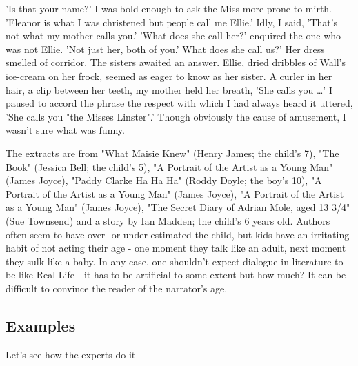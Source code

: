 \documentclass[11pt]{article}
\newenvironment{narrow}[2]{%
 \begin{list}{}{%
  \setlength{\topsep}{0pt}%
  \setlength{\leftmargin}{#1}%
  \setlength{\rightmargin}{#2}%
  \setlength{\listparindent}{\parindent}%
  \setlength{\itemindent}{\parindent}%
  \setlength{\parsep}{\parskip}%
 }%
\item[]}{\end{list}}
\begin{document}
\begin{itemize}
\item
\begin{narrow}{1.0cm}{1.0cm}
'Is that your name?' I was bold enough to ask the Miss more prone to mirth.
'Eleanor is what I was christened but people call me Ellie.'
Idly, I said, 'That's not what my mother calls you.'
'What does she call her?' enquired the one who was not Ellie.
'Not just her, both of you.'
What does she call us?' 
Her dress smelled of corridor.
The sisters awaited an answer. Ellie, dried dribbles of Wall's ice-cream on 
her frock, seemed as eager to know as her sister.
A curler in her hair, a clip between her teeth, my mother held her breath,
'She calls you …' I paused to accord the phrase the respect with which I had 
always heard it uttered, 'She calls you "the Misses Linster".'
Though obviously the cause of amusement, I wasn't sure what was funny. 
\end{narrow}



\end{itemize}


The extracts are from "What Maisie Knew" (Henry James; the child's 7),
"The Book" (Jessica Bell; the child's 5),
"A Portrait of the Artist as a Young Man" (James Joyce),
"Paddy Clarke Ha Ha Ha" (Roddy Doyle; the boy's 10),
"A Portrait of the Artist as a Young Man" (James Joyce),
"A Portrait of the Artist as a Young Man" (James Joyce),
"The Secret Diary of Adrian Mole, aged 13 3/4"  (Sue Townsend) and
a story by Ian Madden; the child's 6 years old.
Authors often seem to have over- or under-estimated the
child, but kids have an irritating habit of not acting their age -
one
moment they talk like an adult, next moment they sulk like a baby. In any case, one shouldn't expect dialogue in literature to be like Real Life - it has to be artificial to some extent but how much? It can be difficult to convince the reader of the narrator's age.



\subsection*{Examples}
Let's see how the experts do it
\end{document}
